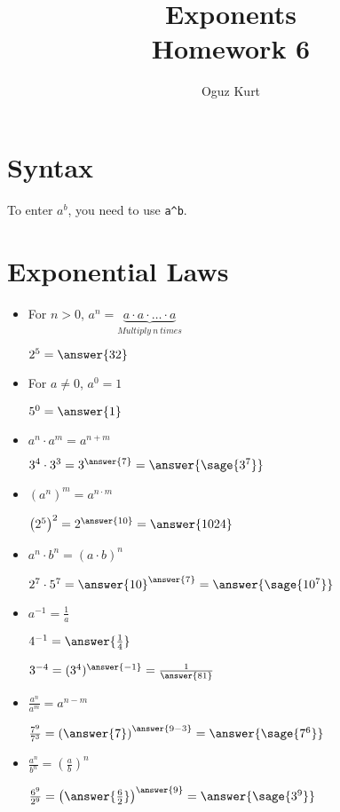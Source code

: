 \documentclass{ximera}
\title{Exponents\\ Homework 6}
\author{Oguz Kurt}
\begin{document}
\maketitle

\section*{Syntax}
To enter {\Large $a^b$}, you need to use {\Large \color{red}\verb|a^b|}.

\section*{Exponential Laws}

\begin{itemize}
    \item For $n>0$, $a^n=\underbrace{a\cdot a \cdot \ldots \cdot a}_{Multiply~ n ~times} $
    \begin{example}
        $2^5=\answer{32}$
    \end{example}
    \item For $a\neq 0$, $a^0=1$
    \begin{example}
        $5^0=\answer{1}$
    \end{example}
    \item $a^n\cdot a^m=a^{n+m}$
    \begin{example}
        $3^4\cdot 3^3=3^{\answer{7}}=\answer{\sage{3^7}}$
    \end{example}

    \item $\left(a^n\right)^m=a^{n\cdot m}$
    \begin{example}
        $\left(2^5\right)^2=2^{\answer{10}}=\answer{1024}$    
    \end{example}
    \item $a^n\cdot b^n =(a\cdot b)^n$
    \begin{example}
        $2^7\cdot 5^7=\answer{10}^{\answer{7}}=\answer{\sage{10^7}}$
    \end{example}
    \item $a^{-1}=\frac{1}{a}$
    \begin{example}
        $4^{-1}=\answer{\frac{1}{4}}$
    \end{example}
    \begin{example}
        $3^{-4}=(3^4)^{\answer{-1}}=\frac{1}{\answer{81}}$
    \end{example}
    \item $\frac{a^n}{a^m}=a^{n-m}$
    \begin{example}
        $\frac{7^9}{7^3}=\left(\answer{7}\right)^{\answer{9-3}}=\answer{\sage{7^6}}$
    \end{example}
    \item $\frac{a^n}{b^n}=\left( \frac{a}{b}\right)^n$
    \begin{example}
        $\frac{6^9}{2^9}=\left(\answer{\frac{6}{2}}\right)^{\answer{9}}=\answer{\sage{3^9}}$    
    \end{example}
\end{itemize}
\end{document}
